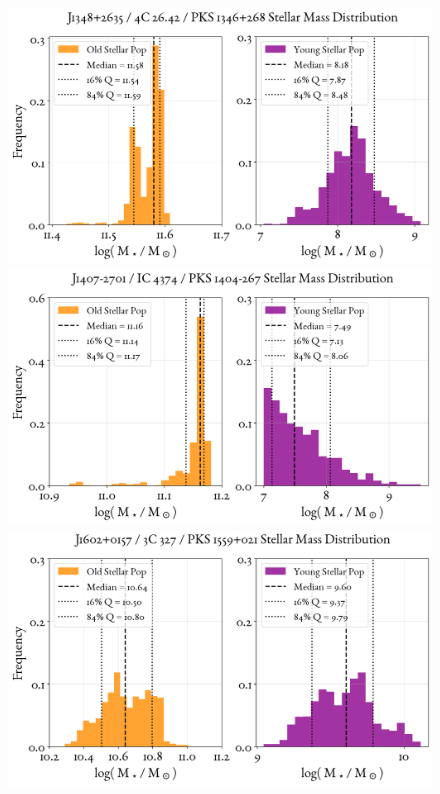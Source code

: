 \begin{figure}
    \centering
    \includegraphics[width=0.8\linewidth]{figures/ResultMasses/56_MassDistri_4326.png}\\
    \includegraphics[width=0.8\linewidth]{figures/ResultMasses/60_MassDistri_4364.png}\\
    \includegraphics[width=0.8\linewidth]{figures/ResultMasses/67_MassDistri_4596.png}    
\end{figure}
